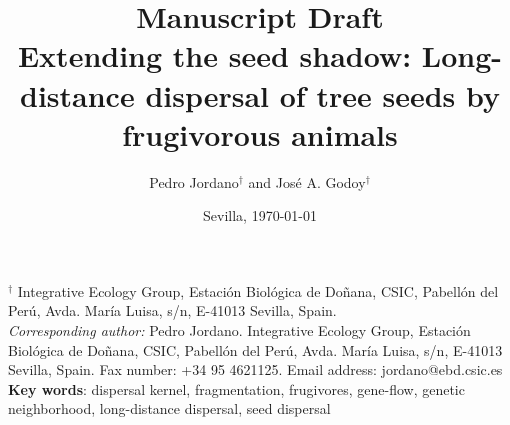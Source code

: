 \documentclass[a4paper,12pt]{article}
\begin{document}
\begin{bibunit}[science]
\title{Manuscript Draft\\
\vspace{2cm}
Extending the seed shadow: Long-distance dispersal of tree seeds by frugivorous animals}

\author{Pedro Jordano$^{\dag}$ and Jos\'e A. Godoy$^{\dag}$}

\date{Sevilla, \today}
\maketitle


\begin{spacing}{1.0}
$^{\dag}$ {\small Integrative Ecology Group, Estaci\'on Biol\'ogica de 
Do\~nana, CSIC, Pabell\'on del Per\'u, Avda. Mar\'ia Luisa, s/n, 
E-41013 Sevilla, Spain.}\\


{\small \textit{Corresponding author:} Pedro Jordano. Integrative Ecology Group, Estaci\'on Biol\'ogica de Do\~nana, CSIC, Pabell\'on del Per\'u, Avda. Mar\'ia Luisa, s/n, E-41013 Sevilla, Spain. Fax number: +34 95 4621125. Email address: jordano@ebd.csic.es}\\

\textbf{Key words}: dispersal kernel, fragmentation, frugivores, gene-flow, genetic neighborhood, long-distance dispersal, seed dispersal\\


\end{spacing}
\end{bibunit}
\end{document}
